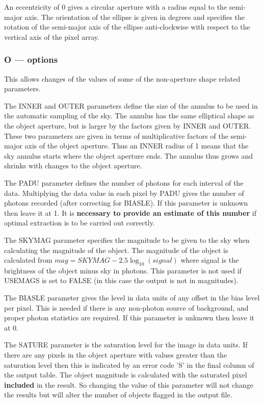 \documentclass[twoside,11pt,nolof]{starlink}
\begin{document}
An eccentricity of 0 gives a circular aperture with a radius equal
to the semi-major axis. The orientation of the ellipse is given in
degrees and specifies the rotation of the semi-major axis of the
ellipse anti-clockwise with respect to the vertical axis of the pixel
array.

\subsubsection{O --- options}

This allows changes of the values of some of the non-aperture shape
related parameters.

The INNER and OUTER parameters define the size of the annulus to be
used in the automatic sampling of the sky. The annulus has the same
elliptical shape as the object aperture, but is larger by the factors
given by INNER and OUTER. These two parameters are given in terms of
multiplicative factors of the semi-major axis of the object aperture.
Thus an INNER radius of 1 means that the sky annulus starts where the
object aperture ends. The annulus thus grows and shrinks with changes
to the object aperture.

The PADU parameter defines the number of photons for each interval of
the data. Multiplying the data value in each pixel by PADU gives the
number of photons recorded (after correcting for BIASLE). If this
parameter is unknown then leave it at 1. It is \textbf{necessary to provide
an estimate of this number} if optimal extraction is to be carried
out correctly.

The SKYMAG parameter specifies the magnitude to be given to the sky
when calculating the magnitude of the object. The magnitude of the
object is calculated from
$mag = SKYMAG - 2.5 \log_{10}(signal)$
where signal is the brightness of the object minus sky in photons.
This parameter is not used if USEMAGS is set to FALSE (in this case
the output is not in magnitudes).

The BIASLE parameter gives the level in data units of any offset in
the bias level per pixel. This is needed if there is any non-photon
source of background, and proper photon statistics are required. If
this parameter is unknown then leave it at 0.

The SATURE parameter is the saturation level for the image in data
units. If there are any pixels in the object aperture with values
greater than the saturation level then this is indicated by an error
code 'S' in the final column of the output table. The object magnitude
is calculated with the saturated pixel \textbf{included} in the
result. So changing the value of this parameter will not change the
results but will alter the number of objects flagged in the output
file.
\end{document}
